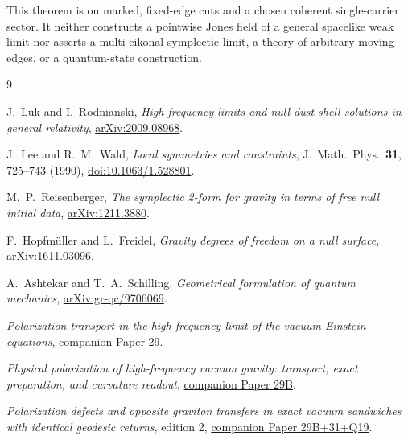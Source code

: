 \documentclass[11pt]{article}
\begin{document}
This theorem is on marked, fixed-edge cuts and a chosen
coherent single-carrier sector. It neither constructs a
pointwise Jones field of a general spacelike weak limit
nor asserts a multi-eikonal symplectic limit, a theory of
arbitrary moving edges, or a quantum-state construction.

\begin{thebibliography}{9}

J.~Luk and I.~Rodnianski,
\emph{High-frequency limits and null dust shell solutions
in general relativity}, \href{https://arxiv.org/abs/2009.08968}{arXiv:2009.08968}.

J.~Lee and R.~M.~Wald,
\emph{Local symmetries and constraints},
J.\ Math.\ Phys.\ \textbf{31}, 725--743 (1990),
\href{https://doi.org/10.1063/1.528801}{doi:10.1063/1.528801}.

M.~P.~Reisenberger,
\emph{The symplectic 2-form for gravity in terms of free
null initial data}, \href{https://arxiv.org/abs/1211.3880}{arXiv:1211.3880}.

F.~Hopfm\"uller and L.~Freidel,
\emph{Gravity degrees of freedom on a null surface},
\href{https://arxiv.org/abs/1611.03096}{arXiv:1611.03096}.

A.~Ashtekar and T.~A.~Schilling,
\emph{Geometrical formulation of quantum mechanics},
\href{https://arxiv.org/abs/gr-qc/9706069}{arXiv:gr-qc/9706069}.

\emph{Polarization transport in the high-frequency limit of the vacuum Einstein equations},
\href{https://github.com/g3173028019-beep/ai-automated-quantum-gravity-research/tree/main/papers/29-high-frequency-graviton-polarization}{companion Paper 29}.

\emph{Physical polarization of high-frequency vacuum gravity: transport, exact preparation, and curvature readout},
\href{https://github.com/g3173028019-beep/ai-automated-quantum-gravity-research/tree/main/papers/29b-high-frequency-graviton-polarization}{companion Paper 29B}.

\emph{Polarization defects and opposite graviton transfers in exact vacuum sandwiches with identical geodesic returns}, edition 2,
\href{https://github.com/g3173028019-beep/ai-automated-quantum-gravity-research/tree/main/papers/29b-31-polarization-defects-graviton-transfer}{companion Paper 29B+31+Q19}.

\end{thebibliography}
\end{document}
